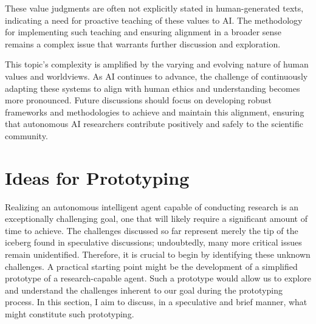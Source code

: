 These value judgments are often not explicitly stated in human-generated texts, indicating a need for proactive teaching of these values to AI. The methodology for implementing such teaching and ensuring alignment in a broader sense remains a complex issue that warrants further discussion and exploration.

This topic's complexity is amplified by the varying and evolving nature of human values and worldviews. As AI continues to advance, the challenge of continuously adapting these systems to align with human ethics and understanding becomes more pronounced. Future discussions should focus on developing robust frameworks and methodologies to achieve and maintain this alignment, ensuring that autonomous AI researchers contribute positively and safely to the scientific community.






\section{Ideas for Prototyping}
Realizing an autonomous intelligent agent capable of conducting research is an exceptionally challenging goal, one that will likely require a significant amount of time to achieve. The challenges discussed so far represent merely the tip of the iceberg found in speculative discussions; undoubtedly, many more critical issues remain unidentified. Therefore, it is crucial to begin by identifying these unknown challenges. A practical starting point might be the development of a simplified prototype of a research-capable agent. Such a prototype would allow us to explore and understand the challenges inherent to our goal during the prototyping process. In this section, I aim to discuss, in a speculative and brief manner, what might constitute such prototyping.

